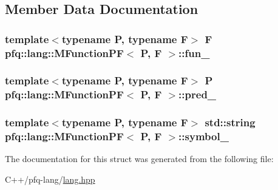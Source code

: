 \subsection{Member Data Documentation}
\hypertarget{structpfq_1_1lang_1_1MFunctionPF_aedde93be885b7e299495822596198996}{
\subsubsection[{fun\+\_\+}]{\setlength{\rightskip}{0pt plus 5cm}template$<$typename P, typename F$>$ F {\bf pfq\+::lang\+::\+M\+Function\+P\+F}$<$ P, F $>$\+::fun\+\_\+}}\label{structpfq_1_1lang_1_1MFunctionPF_aedde93be885b7e299495822596198996}
\hypertarget{structpfq_1_1lang_1_1MFunctionPF_a0a41a14e31e3a15b695dd876a58bf971}{
\subsubsection[{pred\+\_\+}]{\setlength{\rightskip}{0pt plus 5cm}template$<$typename P, typename F$>$ P {\bf pfq\+::lang\+::\+M\+Function\+P\+F}$<$ P, F $>$\+::pred\+\_\+}}\label{structpfq_1_1lang_1_1MFunctionPF_a0a41a14e31e3a15b695dd876a58bf971}
\hypertarget{structpfq_1_1lang_1_1MFunctionPF_a7481c170a22112aaca7c512e363e255a}{
\subsubsection[{symbol\+\_\+}]{\setlength{\rightskip}{0pt plus 5cm}template$<$typename P, typename F$>$ std\+::string {\bf pfq\+::lang\+::\+M\+Function\+P\+F}$<$ P, F $>$\+::symbol\+\_\+}}\label{structpfq_1_1lang_1_1MFunctionPF_a7481c170a22112aaca7c512e363e255a}


The documentation for this struct was generated from the following file\+:\begin{DoxyCompactItemize}
\item 
C++/pfq-\/lang/\hyperlink{lang_8hpp}{lang.\+hpp}\end{DoxyCompactItemize}
